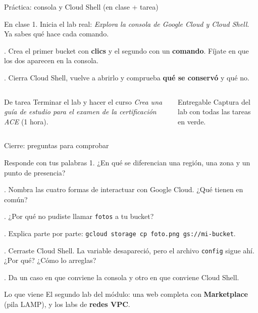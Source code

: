 \documentclass[aspectratio=169,10pt,c]{beamer}
\begin{document}
\begin{frame}{Práctica: consola y Cloud Shell \textnormal{\small(en clase + tarea)}}
\begin{block}{En clase}
\small
1. Inicia el lab real: \emph{Explora la consola de Google Cloud y Cloud Shell}. Ya sabes qué hace cada comando.\par{}. Crea el primer bucket con \textbf{clics} y el segundo con un \textbf{comando}. Fíjate en que los dos aparecen en la consola.\par{}. Cierra Cloud Shell, vuelve a abrirlo y comprueba \textbf{qué se conservó} y qué no.
\end{block}
\begin{columns}[T,onlytextwidth]
\begin{exampleblock}{De tarea}
\small Terminar el lab y hacer el curso \emph{Crea una guía de estudio para el examen de la certificación ACE} (1 hora).
\end{exampleblock}
\begin{alertblock}{Entregable}
\small Captura del lab con todas las tareas en verde.
\end{alertblock}
\end{columns}
\end{frame}

\begin{frame}{Cierre: preguntas para comprobar}
\begin{block}{Responde con tus palabras}
\small
1. ¿En qué se diferencian una región, una zona y un punto de presencia?\par{}. Nombra las cuatro formas de interactuar con Google Cloud. ¿Qué tienen en común?\par{}. ¿Por qué no pudiste llamar \texttt{fotos} a tu bucket?\par{}. Explica parte por parte: \texttt{gcloud storage cp foto.png gs://mi-bucket}.\par{}. Cerraste Cloud Shell. La variable desapareció, pero el archivo \texttt{config} sigue ahí. ¿Por qué? ¿Cómo lo arreglas?\par{}. Da un caso en que conviene la consola y otro en que conviene Cloud Shell.
\end{block}
\begin{alertblock}{Lo que viene}
\small El segundo lab del módulo: una web completa con \textbf{Marketplace} (pila LAMP), y los labs de \textbf{redes VPC}.
\end{alertblock}
\end{frame}
\end{document}
